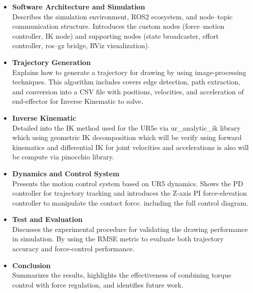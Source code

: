 \begin{itemize}
    \item \textbf{Software Architecture and Simulation} \\
    Describes the simulation environment, ROS2 ecosystem, and node--topic communication structure. Introduces the custom nodes (force--motion controller, IK node) and supporting nodes (state broadcaster, effort controller, ros--gz bridge, RViz visualization).

    \item \textbf{Trajectory Generation} \\
    Explains how to generate a trajectory for drawing by using image-processing techniques. This algorithm includes covers edge detection, path extraction, and conversion into a CSV file with positions, velocities, and acceleration of end-effector for Inverse Kinematic to solve.

    \item \textbf{Inverse Kinematic} \\
    Detailed into the IK method used for the UR5e via ur\_analytic\_ik library which using geometric IK decomposition which will be verify using forward kinematics and differential IK for joint velocities and accelerations is also will be compute via pinocchio library.

    \item \textbf{Dynamics and Control System} \\
    Presents the motion control system based on UR5 dynamics. Shows the PD controller for trajectory tracking and introduces the Z-axis PI force-elevation controller to manipulate the contact force. including the full control diagram.

    \newpage

    \item \textbf{Test and Evaluation} \\
    Discusses the experimental procedure for validating the drawing performance in simulation. By using the RMSE metric to evaluate both trajectory accuracy and force-control performance.

    \item \textbf{Conclusion} \\
    Summarizes the results, highlights the effectiveness of combining torque control with force regulation, and identifies future work.
\end{itemize}
